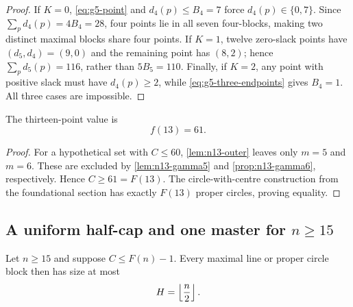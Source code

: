 \begin{proof}
If $K=0$, \eqref{eq:g5-point} and $d_4(p)\leq B_4=7$ force
$d_4(p)\in\{0,7\}$.  Since $\sum_p d_4(p)=4B_4=28$, four points lie in
all seven four-blocks, making two distinct maximal blocks share four
points.  If $K=1$, twelve zero-slack points have $(d_5,d_4)=(9,0)$ and
the remaining point has $(8,2)$; hence $\sum_p d_5(p)=116$, rather than
$5B_5=110$.  Finally, if $K=2$, any point with positive slack must have
$d_4(p)\geq2$, while \eqref{eq:g5-three-endpoints} gives $B_4=1$.
All three cases are impossible.
\end{proof}

\begin{theorem}\label{thm:n13-value}
The thirteen-point value is
\[
 f(13)=61.
\]
\end{theorem}

\begin{proof}
For a hypothetical set with $C\leq60$, \cref{lem:n13-outer} leaves only
$m=5$ and $m=6$.  These are excluded by \cref{lem:n13-gamma5} and
\cref{prop:n13-gamma6}, respectively.  Hence $C\geq61=F(13)$.  The
circle-with-centre construction from the foundational section has exactly
$F(13)$ proper circles, proving equality.
\end{proof}

\subsection{A uniform half-cap and one master for
  \texorpdfstring{$n\geq15$}{n >= 15}}

\begin{lemma}
\label{lem:large-half-cap}
Let $n\geq15$ and suppose $C\leq F(n)-1$.  Every maximal line or proper
circle block then has size at most
\[
 H=\left\lfloor \frac n2\right\rfloor.
\]
\end{lemma}

